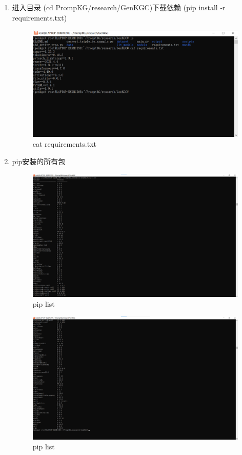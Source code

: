 \documentclass{article}
\begin{document}
\begin{enumerate}
\newpage
    \item 进入目录 (cd PrompKG/research/GenKGC)下载依赖 (pip install -r requirements.txt)
\begin{figure}[htp]
        \centering
        \includegraphics[width=16cm]{进入路径.png}
        \caption{cat requirements.txt}
        \label{pic7}
\end{figure}
    \item pip安装的所有包
\begin{figure}[htp]
        \centering
        \includegraphics[width=14cm]{包1.png}
        \caption{pip list}
        \label{pic7}
\end{figure}
\begin{figure}[htp]
        \centering
        \includegraphics[width=14cm]{包2.png}
        \caption{pip list}
        \label{pic7}
\end{figure}


\end{enumerate}
\end{document}
